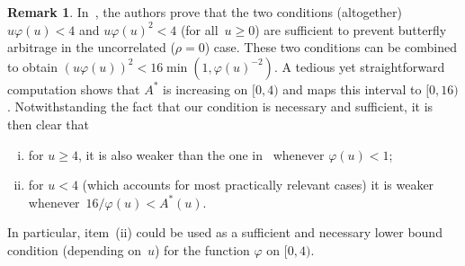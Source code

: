 \documentclass{amsart}[11pt]
\numberwithin{equation}{section}
\theoremstyle{definition}
\newtheorem{remark}[theorem]{Remark}
\begin{document}
\begin{remark}\label{rem:Comparison}
In~\cite{gj}, the authors prove that the two conditions (altogether) $u\varphi(u)<4$ and 
$u\varphi(u)^2<4$ (for all~$u\geq 0$) are sufficient to prevent butterfly arbitrage in the uncorrelated ($\rho=0$) case.
These two conditions can be combined to obtain
$(u\varphi(u))^2<16\min(1,\varphi(u)^{-2})$.
A tedious yet straightforward computation shows that $A^*$ is increasing on $[0,4)$
and maps this interval to $[0,16)$.
Notwithstanding the fact that our condition is necessary and sufficient, it is then clear
that 
\begin{enumerate}[(i)]
\item for $u\geq 4$, it is also weaker than the one in~\cite{gj} whenever $\varphi(u)<1$;
\item for $u<4$ (which accounts for most practically relevant cases) it is weaker
whenever~$16/\varphi(u)<A^*(u)$.
\end{enumerate}
In particular, item~(ii) could be used as a sufficient and necessary lower bound condition (depending on~$u$)
for the function $\varphi$ on $[0,4)$.
\end{remark}





\end{document}
